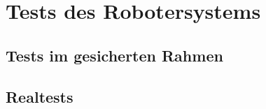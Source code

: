\chapter{Tests des Robotersystems}
\label{cha:tests}
\section{Tests im gesicherten Rahmen}

\section{Realtests}